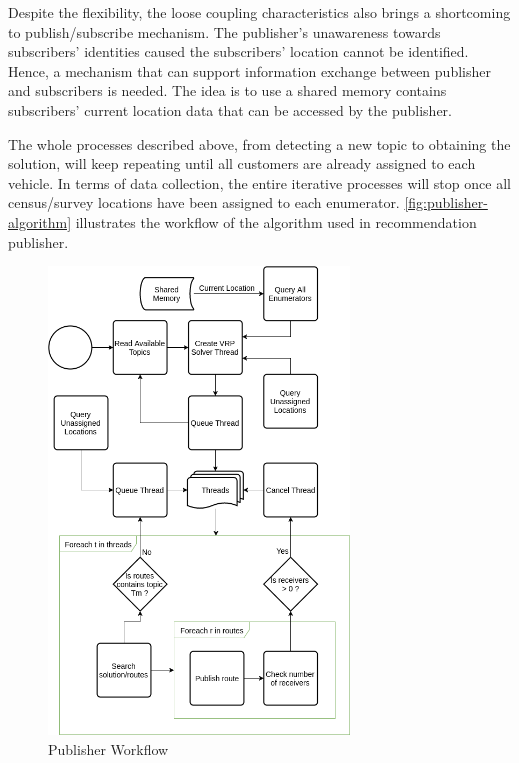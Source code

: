\documentclass[conference]{IEEEtran}
\begin{document}
Despite the flexibility, the loose coupling characteristics also brings a shortcoming to publish/subscribe mechanism. The publisher's unawareness towards subscribers' identities caused the subscribers' location cannot be identified. Hence, a mechanism that can support information exchange between publisher and subscribers is needed. The idea is to use a shared memory contains subscribers' current location data that can be accessed by the publisher. 

The whole processes described above, from detecting a new topic to obtaining the solution, will keep repeating until all customers are already assigned to each vehicle. In terms of data collection, the entire iterative processes will stop once all census/survey locations have been assigned to each enumerator. \autoref{fig:publisher-algorithm} illustrates the workflow of the algorithm used in recommendation publisher.


\begin{figure}[!]
	\centering
	\includegraphics[width=8cm]{Resources/Images/publisher-algorithm}
	\caption{Publisher Workflow}
	\label{fig:publisher-algorithm}
\end{figure} 


\end{document}
